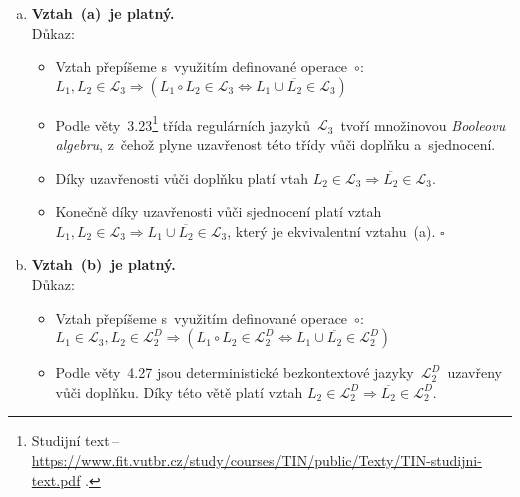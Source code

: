 \documentclass[a4paper, 11pt]{scrartcl}
\newcommand*{\QEDB}{\hfill\ensuremath{\square}}
\begin{document}
    \begin{enumerate}[(a)]
        \item
            \textbf{Vztah~(a)~je platný.} \\
            Důkaz:
            \begin{itemize}
                \item
                    Vztah přepíšeme s~využitím definované operace~$ \circ $: \\
                    $ L_1, L_2 \in \mathcal{L}_3 \Rightarrow (L_1 \circ L_2 \in
                    \mathcal{L}_3 \Leftrightarrow L_1 \cup \overline{L_2} \in
                    \mathcal{L}_3) $

                \item
                    Podle věty~3.23\footnote{\label{tin}Studijní text\,--\,%
                        \url{https://www.fit.vutbr.cz/study/courses/TIN/public/Texty/TIN-studijni-text.pdf}%
                    .}
                    třída regulárních jazyků~$ \mathcal{L}_3 $~tvoří množinovou
                    \emph{Booleovu algebru}, z~čehož plyne uzavřenost této
                    třídy vůči doplňku a~sjednocení.

                \item
                    Díky uzavřenosti vůči doplňku platí vtah $ L_2 \in
                    \mathcal{L}_3 \Rightarrow \overline{L_2} \in
                    \mathcal{L}_3 $.

                \item
                    Konečně díky uzavřenosti vůči sjednocení platí vztah $ L_1,
                    L_2 \in \mathcal{L}_3 \Rightarrow L_1 \cup \overline{L_2}
                    \in \mathcal{L}_3 $, který je ekvivalentní vztahu~(a). \QEDB
            \end{itemize}

        \item
            \textbf{Vztah~(b)~je platný.} \\
            Důkaz:
            \begin{itemize}
                \item
                    Vztah přepíšeme s~využitím definované operace~$ \circ $: \\
                    $ L_1 \in \mathcal{L}_3, L_2 \in \mathcal{L}_2^D \Rightarrow
                    (L_1 \circ L_2 \in \mathcal{L}_2^D \Leftrightarrow L_1
                    \cup \overline{L_2} \in \mathcal{L}_2^D) $

                \item
                    Podle věty~4.27 jsou deterministické
                    bezkontextové jazyky~$ \mathcal{L}_2^D $~uzavřeny vůči
                    doplňku. Díky této větě platí vztah $ L_2 \in
                    \mathcal{L}_2^D \Rightarrow \overline{L_2} \in
                    \mathcal{L}_2^D $.


\end{itemize}
\end{enumerate}
\end{document}
